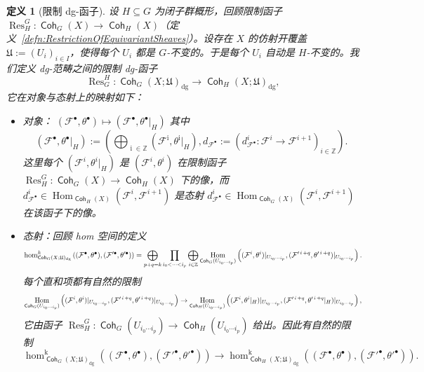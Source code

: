 \documentclass[11pt,a4paper]{article}
\DeclareMathOperator{\Res}{\mathrm{Res}}
\DeclareMathOperator{\Coh}{\mathsf{Coh}}
\DeclareMathOperator{\Hom}{\operatorname{Hom}}
\DeclareMathOperator{\dg}{\operatorname{dg}}
\DeclareMathOperator{\objectdegree}{{\text{$i$}}}
\DeclareMathOperator{\homdegree}{{\text{$k$}}}
\theoremstyle{cnth}
\newtheorem{defn}[thm]{定义}
\begin{document}
\begin{defn}[限制 dg-函子]
设 $H\subseteq G$ 为闭子群概形，回顾限制函子 $\Res^G_H:\Coh_G(X)\rightarrow\Coh_H(X)$（定义~\ref{defn:RestrictionOfEquivariantSheaves}）。设存在 $X$ 的仿射开覆盖 $\mathfrak U:=(U_i)_{i\in I}$，使得每个 $U_i$ 都是 $G$-不变的。于是每个 $U_i$ 自动是 $H$-不变的。我们定义 dg-范畴之间的限制 dg-函子
$$
\Res_G^H:\Coh_G(X;\mathfrak{U})_{\dg}\rightarrow\Coh_H(X;\mathfrak{U})_{\dg},
$$
它在对象与态射上的映射如下：
\begin{itemize}
\item
对象：
$
(\mathcal{F}^{\bullet},\theta^{\bullet})
\mapsto
(\mathcal{F}^{\bullet},\theta^{\bullet}|_H)
$
其中
$$
(\mathcal{F}^{\bullet},\theta^{\bullet}|_H)
:=
\left(
\bigoplus_{\objectdegree\in\mathbb Z}
(\mathcal F^{\objectdegree},\theta^{\objectdegree}|_H),
d_{\mathcal F^\bullet}
:=
\left(d_{\mathcal{F}^{\bullet}}^i:\mathcal{F}^i\rightarrow\mathcal{F}^{i+1}\right)_{i\in\mathbb{Z}}
\right).
$$
这里每个 $(\mathcal{F}^i,\theta^i|_H)$ 是 $(\mathcal{F}^i,\theta^i)$ 在限制函子 $\Res^G_H:\Coh_G(X)\rightarrow\Coh_H(X)$ 下的像，而 $d_{\mathcal{F}^{\bullet}}^i\in\Hom_{\Coh_H(X)}(\mathcal F^i,\mathcal F^{i+1})$ 是态射 $d_{\mathcal{F}^{\bullet}}^i\in\Hom_{\Coh_G(X)}(\mathcal F^i,\mathcal F^{i+1})$ 在该函子下的像。
\item
态射：回顾 hom 空间的定义
\[
\resizebox{\linewidth}{!}{$\displaystyle
\hom_{\Coh_G(X;\mathfrak U)_{\dg}}^{\homdegree}
\left(
(\mathcal F^\bullet,\theta^\bullet),
(\mathcal F'^\bullet,\theta'^\bullet)
\right)
=
\bigoplus_{p+q=\homdegree}
\prod_{i_0<\cdots<i_p}
\bigoplus_{\objectdegree\in\mathbb Z}
\Hom_{\Coh_G(U_{i_0\cdots i_p})}
\left(
(\mathcal F^{\objectdegree},\theta^{\objectdegree})
|_{U_{i_0\cdots i_p}},
(\mathcal F'^{\objectdegree+q},\theta'^{\objectdegree+q})
|_{U_{i_0\cdots i_p}}
\right).$}
\]
每个直和项都有自然的限制
\[
\resizebox{\linewidth}{!}{$\displaystyle
\Hom_{\Coh_G(U_{i_0\cdots i_p})}
\left(
(\mathcal F^{\objectdegree},\theta^{\objectdegree})
|_{U_{i_0\cdots i_p}},
(\mathcal F'^{\objectdegree+q},\theta'^{\objectdegree+q})
|_{U_{i_0\cdots i_p}}
\right)
\rightarrow
\Hom_{\Coh_H(U_{i_0\cdots i_p})}
\left(
(\mathcal F^{\objectdegree},\theta^{\objectdegree}|_H)
|_{U_{i_0\cdots i_p}},
(\mathcal F'^{\objectdegree+q},\theta'^{\objectdegree+q}|_H)
|_{U_{i_0\cdots i_p}}
\right),$}
\]
它由函子 $\Res^G_H:\Coh_G(U_{i_0\cdots i_p})\rightarrow\Coh_H(U_{i_0\cdots i_p})$ 给出。因此有自然的限制
$$
\hom_{\Coh_G(X;\mathfrak U)_{\dg}}^{\homdegree}
\left(
(\mathcal F^\bullet,\theta^\bullet),
(\mathcal F'^\bullet,\theta'^\bullet)
\right)
\rightarrow
\hom_{\Coh_H(X;\mathfrak U)_{\dg}}^{\homdegree}
\left(
(\mathcal F^\bullet,\theta^\bullet),
(\mathcal F'^\bullet,\theta'^\bullet)
\right).
$$
\end{itemize}
\end{defn}
\end{document}
